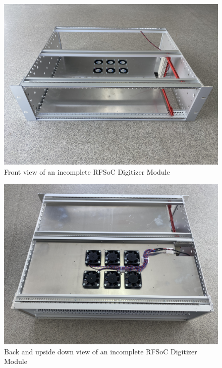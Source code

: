 \documentclass[12pt,a4paper,oneside]{article}
\begin{document}
\begin{figure}[H]
\centering
\includegraphics[width=1\linewidth]{figures/Six_Fan_Front.jpeg}
\caption{Front view of an incomplete RFSoC Digitizer Module}
\label{fig:six_fan_front}
\end{figure}

\begin{figure}[H]
\centering
\includegraphics[width=1\linewidth]{figures/Six_Fan_Back.jpeg}
\caption{Back and upside down view of an incomplete RFSoC Digitizer Module}
\label{fig:six_fan_back}
\end{figure}

\end{document}
